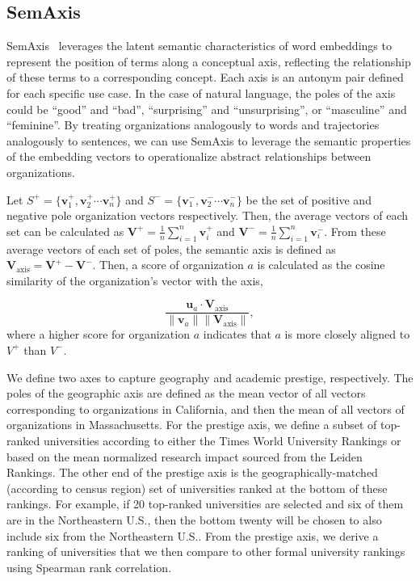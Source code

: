 \documentclass[12pt]{article} %
\begin{document}
\subsection*{SemAxis}
SemAxis~\autocite{an2018semaxis, nakandala2017gendered, kozlowski2018geometry} leverages the latent semantic characteristics of word embeddings to represent the position of terms along a conceptual axis, reflecting the relationship of these terms to a corresponding concept.
Each axis is an antonym pair defined for each specific use case.
In the case of natural language, the poles of the axis could be ``good'' and ``bad'', ``surprising'' and ``unsurprising'', or ``masculine'' and ``feminine''.
By treating organizations analogously to words and trajectories analogously to sentences, we can use SemAxis to leverage the semantic properties of the embedding vectors to operationalize abstract relationships between organizations.

 Let $S^+ = \{\bm{v}_1^+, \bm{v}_2^+ \cdots \bm{v}_n^+\}$ and $S^- =\{\bm{v}_1^-, \bm{v}_2^- \cdots \bm{v}_n^-\}$ be the set of positive and negative pole organization vectors respectively. 
Then, the average vectors of each set can be calculated as $\bm{V}^{+} = \frac{1}{n}\sum^n_{i=1} \bm{v}_i^+$ and $\bm{V}^{-} = \frac{1}{n}\sum^n_{i=1} \bm{v}_i^-$. 
From these average vectors of each set of poles, the semantic axis is defined as $\bm{V}_{\text{axis}} = \bm{V}^{+} - \bm{V}^{-}$. Then,  a score of organization $a$ is calculated as the cosine similarity of the organization's vector with the axis,

\begin{equation}
\frac{\bm{u}_{a} \cdot \bm{V}_{\text{axis}}}{\lVert \bm{v}_{a} \rVert \lVert \bm{V}_{\text{axis}} \rVert},
\end{equation}
where a higher score for organization $a$ indicates that $a$ is more closely aligned to $V^+$ than $V^-$.

We define two axes to capture geography and academic prestige, respectively.
The poles of the geographic axis are defined as the mean vector of all vectors corresponding to organizations in California, and then the mean of all vectors of organizations in Massachusetts.
For the prestige axis, we define a subset of top-ranked universities according to either the Times World University Rankings or based on the mean normalized research impact sourced from the Leiden Rankings.
The other end of the prestige axis is the geographically-matched (according to census region) set of universities ranked at the bottom of these rankings.
For example, if 20 top-ranked universities are selected and six of them are in the Northeastern U.S., then the bottom twenty will be chosen to also include six from the Northeastern U.S..
From the prestige axis, we derive a ranking of universities that we then compare to other formal university rankings using Spearman rank correlation.
\end{document}
